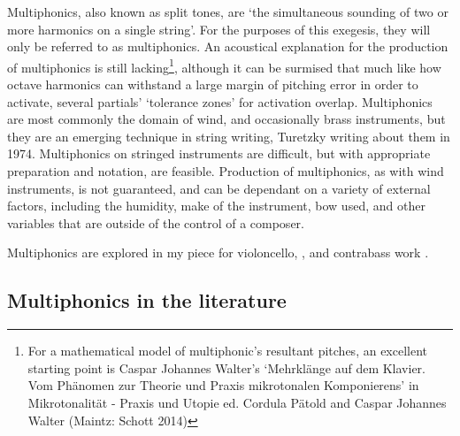 Multiphonics, also known as split tones, are `the simultaneous sounding of two or more harmonics on a single string'.\autocites[108]{fallowfieldCelloMapHandbook2009}[http://www.cellomap.com/index/the-string/the-left-hand.html]{fallowfieldCelloMap}
For the purposes of this exegesis, they will only be referred to as multiphonics.
An acoustical explanation for the production of multiphonics is still lacking\footnote{For a mathematical model of multiphonic's resultant pitches, an excellent starting point is Caspar Johannes Walter's `Mehrklänge auf dem Klavier. Vom Phänomen zur Theorie und Praxis mikrotonalen Komponierens' in Mikrotonalität - Praxis und Utopie ed. Cordula Pätold and Caspar Johannes Walter (Maintz: Schott 2014)}, although it can be surmised that much like how octave harmonics can withstand a large margin of pitching error in order to activate, several partials' `tolerance zones' for activation overlap.\autocites[146]{fallowfieldCelloMapHandbook2009}{bloggsFeedbackContrabassSession2019}
Multiphonics are most commonly the domain of wind, and occasionally brass instruments, but they are an emerging technique in string writing, Turetzky writing about them in 1974.\autocite[138]{turetzkyContemporaryContrabass1974}
Multiphonics on stringed instruments are difficult, but with appropriate preparation and notation, are feasible. 
Production of multiphonics, as with wind instruments, is not guaranteed, and can be dependant on a variety of external factors, including the humidity, make of the instrument, bow used, and other variables that are outside of the control of a composer. 

Multiphonics are explored in my piece for violoncello, , and contrabass work .

\subsection{Multiphonics in the literature}

